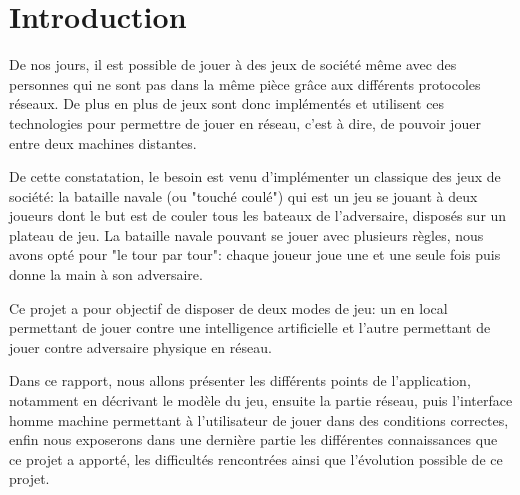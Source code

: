 \section*{Introduction} %
	De nos jours, il est possible de jouer à des jeux de société même avec des personnes qui ne sont pas dans la même pièce grâce aux différents protocoles réseaux. De plus en plus de jeux sont donc implémentés et utilisent ces technologies pour permettre de jouer en réseau, c'est à dire, de pouvoir jouer entre deux machines distantes. \newline

	De cette constatation, le besoin est venu d'implémenter un classique des jeux de société: la bataille navale (ou "touché coulé") qui est un jeu se jouant à deux joueurs dont le but est de couler tous les bateaux de l'adversaire, disposés sur un plateau de jeu. La bataille navale pouvant se jouer avec plusieurs règles, nous avons opté pour "le tour par tour": chaque joueur joue une et une seule fois puis donne la main à son adversaire. \newline
	
	Ce projet a pour objectif de disposer de deux modes de jeu: un en local permettant de jouer contre une intelligence artificielle et l'autre permettant de jouer contre adversaire physique en réseau.\newline
	
	Dans ce rapport, nous allons présenter les différents points de l'application, notamment en décrivant le modèle du jeu, ensuite la partie réseau, puis l'interface homme machine permettant à l'utilisateur de jouer dans des conditions correctes, enfin nous exposerons dans une dernière partie les différentes connaissances que ce projet a apporté, les difficultés rencontrées ainsi que l'évolution possible de ce projet.
